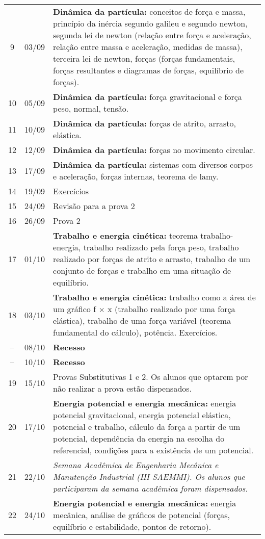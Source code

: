 \begin{center}
\begin{longtable}{ccp{70mm}}
  9 & 03/09 & \textbf{Dinâmica da partícula:} conceitos de força e massa, princípio da inércia segundo galileu e segundo newton, segunda lei de newton (relação entre força e aceleração, relação entre massa e aceleração, medidas de massa), terceira lei de newton, forças (forças fundamentais, forças resultantes e diagramas de forças, equilíbrio de forças).\\
 10 & 05/09 & \textbf{Dinâmica da partícula:} força gravitacional e força peso, normal, tensão.\\
 11 & 10/09 & \textbf{Dinâmica da partícula:} forças de atrito, arrasto, elástica.\\
 12 & 12/09 & \textbf{Dinâmica da partícula:} forças no movimento circular.\\
 13 & 17/09 & \textbf{Dinâmica da partícula:} sistemas com diversos corpos e aceleração, forças internas, teorema de lamy.\\
 14 & 19/09 & Exercícios\\
 15 & 24/09 & Revisão para a prova 2\\
 16 & 26/09 & Prova 2\\
 17 & 01/10 & \textbf{Trabalho e energia cinética:} teorema trabalho-energia, trabalho realizado pela força peso, trabalho realizado por forças de atrito e arrasto, trabalho de um conjunto de forças e trabalho em uma situação de equilíbrio.\\
 18 & 03/10 & \textbf{Trabalho e energia cinética:} trabalho como a área de um gráfico f × x (trabalho realizado por uma força elástica), trabalho de uma força variável (teorema fundamental do cálculo), potência. Exercícios.\\
 -- & 08/10 & \textbf{Recesso}\\
 -- & 10/10 & \textbf{Recesso} \\
 19 & 15/10 & Provas Substitutivas 1 e 2. Os alunos que optarem por não realizar a prova estão dispensados.\\
 20 & 17/10 & \textbf{Energia potencial e energia mecânica:} energia potencial gravitacional, energia potencial elástica, potencial e trabalho, cálculo da força a partir de um potencial, dependência da energia na escolha do referencial, condições para a existência de um potencial.\\
 21 & 22/10 & \textit{Semana Acadêmica de Engenharia Mecânica e Manutenção Industrial (III SAEMMI). Os alunos que participaram da semana acadêmica foram dispensados.} \\ 
 22 & 24/10 & \textbf{Energia potencial e energia mecânica:} energia mecânica, análise de gráficos de potencial (forças, equilíbrio e estabilidade, pontos de retorno). \\

\end{longtable}
\end{center}
